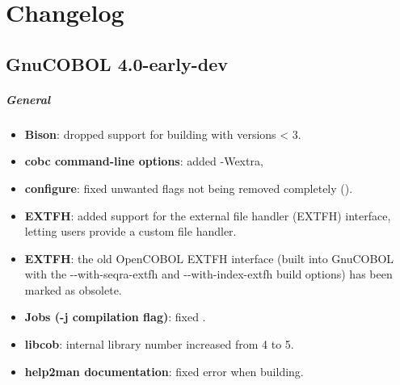 \chapter{Changelog}

\section{GnuCOBOL 4.0-early-dev}

\paragraph{General}
\begin{itemize}
\item \textbf{Bison}: dropped support for building with versions < 3.
\item \textbf{cobc command-line options}: added -Wextra,
\item \textbf{configure}: fixed unwanted flags not being removed completely ().
\item \textbf{EXTFH}: added support for the external file handler (EXTFH) interface, letting users provide a custom file handler.
\item \textbf{EXTFH}: the old OpenCOBOL EXTFH interface (built into GnuCOBOL with the -{}-with-seqra-extfh and -{}-with-index-extfh build options) has been marked as obsolete.
\item \textbf{Jobs (-j compilation flag)}: fixed .
\item \textbf{libcob}: internal library number increased from 4 to 5.
\item \textbf{help2man documentation}: fixed error when building.
\end{itemize}

